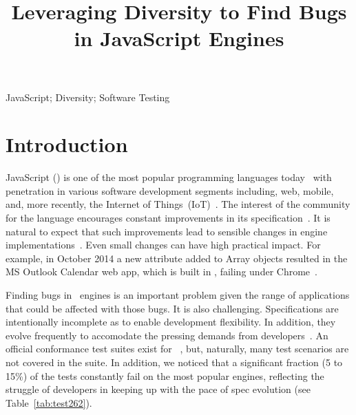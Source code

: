 \documentclass[10pt,conference,anonymous]{IEEEtran}
\begin{document}
\title{Leveraging Diversity to Find Bugs\\ in JavaScript Engines}


\maketitle

\thispagestyle{plain}
\pagestyle{plain}

\begin{abstract}
  
\end{abstract}

\begin{IEEEkeywords}
JavaScript; Diversity; Software Testing
\end{IEEEkeywords}

\section{Introduction}

JavaScript (\js{}) is one of the most popular programming languages
today~\cite{redmonk-javascript,stackify} with
penetration in various software development segments including, web, mobile,
and, more recently, the Internet of
Things~(IoT)~\cite{simply-technologies}. The interest of the community
for the language encourages constant improvements in its specification~\cite{ecmas262-spec}. It is natural to expect that such improvements
lead to sensible changes in engine implementations~\cite{kangax}. Even small
changes can have high practical impact. For example, in October 2014 a
new attribute added to Array objects resulted in the MS Outlook
Calendar web app, which is built in \js{}, failing under
Chrome~\cite{array-bug-chromium-issue4247,array-bug-discussion}.

Finding bugs in \js\ engines is an important problem given the range
of applications that could be affected with those bugs. It is also
challenging.  Specifications are intentionally incomplete as to enable
development flexibility. In addition, they evolve frequently to
accomodate the pressing demands from
developers~\cite{ecmas262-spec-repo}. An official conformance test
suites exist for \js~\cite{tc39-github}, but, naturally, many test
scenarios are not covered in the suite. In addition, we noticed that a
significant fraction (5 to 15\%) of the tests constantly fail on the
most popular engines, reflecting the struggle of developers in keeping
up with the pace of spec evolution (see Table~\ref{tab:test262}).
\end{document}
